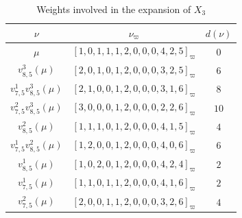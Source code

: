 \begin{table}[h] 
    \centering
    \renewcommand{\arraystretch}{1.5}
    \begin{tabular}{|c|c|c|}\hline
       $\nu$  & $\nu_\varpi$   &  $d(\nu)$  \\ \hline 
        $\mu$ &  $[1, 0, 1, 1, 1, 2, 0, 0, 0, 4, 2, 5]_{\varpi}$  &   $0 $  \\ \hline
        $v^{3}_{8,5}(\mu)$ &  $[2, 0, 1, 0, 1, 2, 0, 0, 0, 3, 2, 5]_{\varpi}$  &   $6$  \\ \hline
        $v^1_{7,5}v^{3}_{8,5}(\mu)$ &  $[2, 1, 0, 0, 1, 2, 0, 0, 0, 3, 1, 6]_{\varpi}$  &   $8 $  \\ \hline
        $v^2_{7,5}v^{3}_{8,5}(\mu)$ &  $[3, 0, 0, 0, 1, 2, 0, 0, 0, 2, 2, 6]_{\varpi}$  &   $10 $  \\ \hline
        $v^2_{8,5}(\mu)$ &  $[1, 1, 1, 0, 1, 2, 0, 0, 0, 4, 1, 5]_{\varpi}$  &   $4 $  \\ \hline
        $v^{1}_{7,5}v^2_{8,5}(\mu)$ &  $[1, 2, 0, 0, 1, 2, 0, 0, 0, 4, 0, 6]_{\varpi}$  &   $6 $  \\ \hline
        $v^{1}_{8,5}(\mu)$ &  $[1, 0, 2, 0, 1, 2, 0, 0, 0, 4, 2, 4]_{\varpi}$  &   $2$  \\ \hline
        $v^{1}_{7,5}(\mu)$ &  $[1, 1, 0, 1, 1, 2, 0, 0, 0, 4, 1, 6]_{\varpi}$  &   $2 $  \\ \hline
        $v^{2}_{7,5}(\mu)$ &  $[2, 0, 0, 1, 1, 2, 0, 0, 0, 3, 2, 6]_{\varpi}$  &   $4 $  \\ \hline
    \end{tabular}
    \renewcommand{\arraystretch}{1}
    \caption{Weights involved in the expansion of $X_3$}
    \label{tab: good pair}
\end{table}





